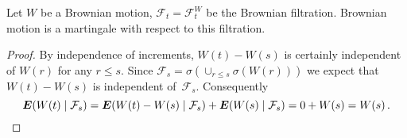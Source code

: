 \begin{theorem}
  Let $W$ be a Brownian motion, $\mathcal F_t = \mathcal F_t^W$ be the Brownian filtration.
  Brownian motion is a martingale with respect to this filtration.
\end{theorem}
\begin{proof}
  By independence of increments, $W(t) - W(s)$ is certainly independent of $W(r)$ for any $r \leq s$.
  Since $\mathcal F_s = \sigma( \cup_{r \leq s}\sigma(W(r)) )$ we expect that $W(t) - W(s)$ is independent of~$\mathcal F_s$.
  Consequently
  \begin{equation*}
    \E( W(t) \given \mathcal F_s )
      = \E( W(t) - W(s) \given \mathcal F_s)
        + \E( W(s) \given \mathcal F_s)
      = 0 + W(s) = W(s)\,.
      \qedhere
  \end{equation*}
\end{proof}

